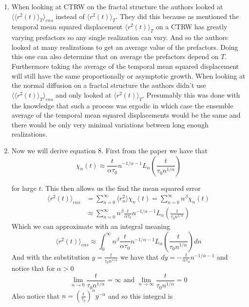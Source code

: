 \documentclass[12pt]{amsart}
\theoremstyle{definition}
\newcommand{\ra}{\rightarrow}
\newcommand{\ip}[1]{\langle#1\rangle}
\begin{document}
\begin{enumerate}
\item When looking at CTRW on the fractal structure the authors looked at $\ip{\ip{r^2(t)}_{T}}_{ens}$ instead of $\ip{r^2(t)}_{T}$. They did this because as mentioned the temporal mean squared displacement $\ip{r^2(t)}_{T}$ on a CTRW has greatly varying prefactors so any single realization can vary. And so the authors looked at many realizations to get an average value of the prefactors. Doing this one can also determine that on average the prefactors depend on $T$. Furthermore taking the average of the temporal mean squared displacement will still have the same proportionally or asymptotic growth. When looking at the normal diffusion on a fractal structure the authors didn't use $\ip{\ip{r^2(t)}_{T}}_{ens}$ and only looked at $\ip{r^2(t)}_{T}$. Presumably this was done with the knowledge that such a process was ergodic in which case the ensemble average of the temporal mean squared displacements would be the same and there would be only very minimal variations between long enough realizations.\\

\item Now we will derive equation 8. First from the paper we have that 
$$\chi_n(t)\approx \frac{t}{\alpha\tau_0}n^{-1/\alpha-1}L_\alpha\left(\frac{t}{\tau_0 n^{1/\alpha}}\right)$$

for large $t$. This then allows us the find the mean squared error
\begin{align*}
    \ip{r^2(t)}_{ens}&=\sum_{n=0}^\infty \ip{r^2_n}\chi_n(t)=\sum_{n=0}^\infty n^\beta\chi_n(t)\\
    &\approx\sum_{n=0}^\infty n^\beta\frac{t}{\alpha\tau_0}n^{-1/\alpha-1}L_\alpha\left(\frac{t}{\tau_0 n^{1/\alpha}}\right)
\end{align*}
Which we can approximate with an integral meaning
\begin{equation*}
    \ip{r^2(t)}_{ens}\approx\int_{0}^\infty n^\beta\frac{t}{\alpha\tau_0}n^{-1/\alpha-1}L_\alpha\left(\frac{t}{\tau_0 n^{1/\alpha}}\right)dn
\end{equation*}
And with the substitution $\displaystyle{y=\frac{t}{\tau_0n^{1/\alpha}}}$ we have that $\displaystyle{dy=-\frac{t}{\alpha\tau_0}n^{-1/\alpha-1}}$ and notice that for $\alpha>0$ 
$$\displaystyle{\lim_{n\ra 0}\frac{t}{\tau_0n^{1/\alpha}}=\infty}\text{ and } \displaystyle{\lim_{n\ra\infty}\frac{t}{\tau_0n^{1/\alpha}}=0}$$
Also notice that $n=\left(\frac{t}{\tau_0}\right)^\alpha y^{-\alpha}$ and so this integral is


\end{enumerate}
\end{document}
